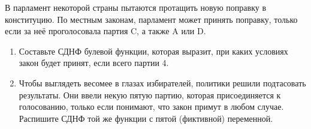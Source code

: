 \question
В парламент некоторой страны пытаются протащить новую поправку в конституцию. По местным законам, парламент может принять поправку, только если за неё проголосовала партия C, а также A или D.

\begin{enumerate}
    \item Составьте СДНФ булевой функции, которая выразит, при каких условиях закон будет принят, если всего партии 4.
    \item Чтобы выглядеть весомее в глазах избирателей, политики решили подтасовать результаты.  Они ввели некую пятую партию, которая присоединяется к голосованию, только если понимают, что закон примут в любом случае. Распишите СДНФ той же функции с пятой (фиктивной) переменной.
\end{enumerate}